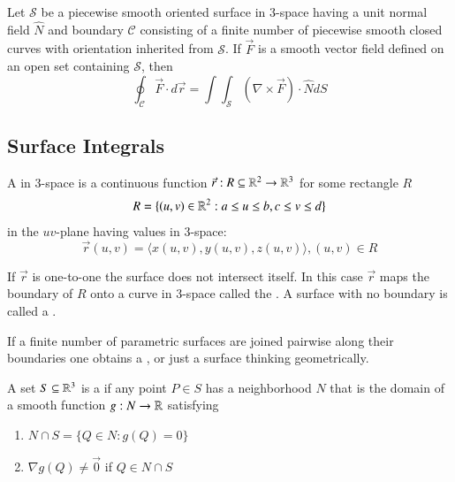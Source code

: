 \documentclass[12pt, a4paper, oneside, openright, titlepage]{book}
\begin{document}
\begin{appendices}
    \begin{namthm}
        Let $\mathcal{S}$ be a piecewise smooth oriented surface in $3$-space having a unit normal field $\hat{N}$ and boundary $\mathcal{C}$ consisting of a finite number of piecewise smooth closed curves with orientation inherited from $\mathcal{S}$. If $\vec{F}$ is a smooth vector field defined on an open set containing $\mathcal{S}$, then \begin{equation}
            \oint_{\mathcal{C}}\vec{F}\cdot d\vec{r} = \int\int_{\mathcal{S}}(\nabla \times \vec{F})\cdot \hat{N}dS
        \end{equation}
    \end{namthm}
    
    \subsection{Surface Integrals}
    
    \begin{defn}
        A  in $3$-space is a continuous function $\vec{r}: R \subseteq \mathbb R^2 \rightarrow \mathbb R^3$ for some rectangle $R$ \begin{equation}
            R = \{(u,v) \in \mathbb R^2: a \leq u \leq b, c \leq v \leq d\}
        \end{equation}
        in the $uv$-plane having values in $3$-space: \begin{equation}
            \vec{r}(u,v) = \langle x(u,v), y(u,v), z(u,v)\rangle, (u,v) \in R
        \end{equation}
    \end{defn}
    
    \begin{rmk}
        If $\vec{r}$ is one-to-one the surface does not intersect itself. In this case $\vec{r}$ maps the boundary of $R$ onto a curve in $3$-space called the . A surface with no boundary is called a .
    \end{rmk}
    
    \begin{defn}
        If a finite number of parametric surfaces are joined pairwise along their boundaries one obtains a , or just a surface thinking geometrically.
    \end{defn}
    
    \begin{defn}
        A set $S \subseteq\mathbb R^3$ is a  if any point $P \in S$ has a neighborhood $N$ that is the domain of a smooth function $g:N \rightarrow \mathbb R$ satisfying \begin{enumerate}
            \item $N \cap S = \{Q \in N:g(Q) = 0\}$
            \item $\nabla g(Q) \neq \vec{0}$ if $Q \in N \cap S$
        \end{enumerate}
    \end{defn}
    

\end{appendices}
\end{document}
